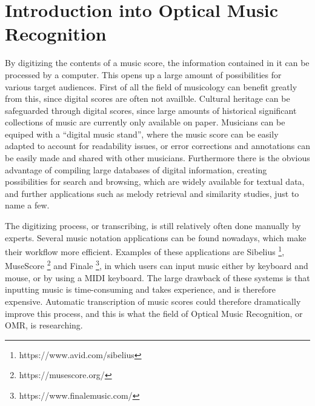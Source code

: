 \section{Introduction into Optical Music Recognition}\label{sec:introduction-OMR}
By digitizing the contents of a music score, the information contained in it can be processed by a computer. This opens up a large amount of possibilities for various target audiences. First of all the field of musicology can benefit greatly from this, since digital scores are often not availble. Cultural heritage can be safeguarded through digital scores, since large amounts of historical significant collections of music are currently only available on paper. Musicians can be equiped with a ``digital music stand'', where the music score can be easily adapted to account for readability issues, or error corrections and annotations can be easily made and shared with other musicians. Furthermore there is the obvious advantage of compiling large databases of digital information, creating possibilities for search and browsing, which are widely available for textual data, and further applications such as melody retrieval and similarity studies, just to name a few.

The digitizing process, or transcribing, is still relatively often done manually by experts. Several music notation applications can be found nowadays, which make their workflow more efficient. Examples of these applications are Sibelius \footnote{https://www.avid.com/sibelius}, MuseScore \footnote{https://musescore.org/} and Finale \footnote{https://www.finalemusic.com/}, in which users can input music either by keyboard and mouse, or by using a MIDI keyboard. The large drawback of these systems is that inputting music is time-consuming and takes experience, and is therefore expensive. Automatic transcription of music scores could therefore dramatically improve this process, and this is what the field of Optical Music Recognition, or OMR, is researching.

